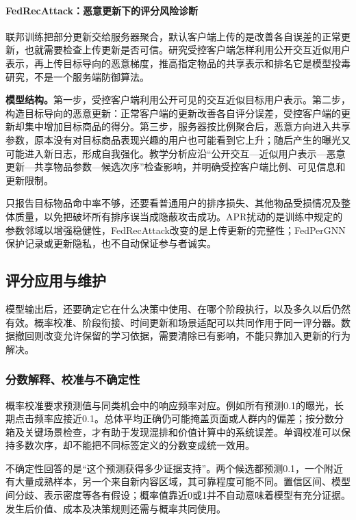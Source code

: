 \paragraph{FedRecAttack：恶意更新下的评分风险诊断}
\label{sec:rs-fedrecattack}

联邦训练把部分更新交给服务器聚合，默认客户端上传的是改善各自误差的正常更新，也就需要检查上传更新是否可信。研究受控客户端怎样利用公开交互近似用户表示，再上传目标导向的恶意梯度，推高指定物品的共享表示和排名它是模型投毒研究，不是一个服务端防御算法。

\textbf{模型结构。}第一步，受控客户端利用公开可见的交互近似目标用户表示。第二步，构造目标导向的恶意更新：正常客户端的更新改善各自评分误差，受控客户端的更新却集中增加目标商品的得分。第三步，服务器按比例聚合后，恶意方向进入共享参数，原本没有对目标商品表现兴趣的用户也可能看到它上升；随后产生的曝光又可能进入新日志，形成自我强化。教学分析应沿“公开交互—近似用户表示—恶意更新—共享物品参数—候选次序”检查影响，并明确受控客户端比例、可见信息和更新限制。

只报告目标物品命中率不够，还要看普通用户的排序损失、其他物品受损情况及整体质量，以免把破坏所有排序误当成隐蔽攻击成功。APR扰动的是训练中规定的参数邻域以增强稳健性，FedRecAttack改变的是上传更新的完整性；FedPerGNN保护记录或更新隐私，也不自动保证参与者诚实。

\subsection{评分应用与维护}
\label{sec:rs-scoring-maintenance}

模型输出后，还要确定它在什么决策中使用、在哪个阶段执行，以及多久以后仍然有效。概率校准、阶段衔接、时间更新和场景适配可以共同作用于同一评分器。数据撤回则改变允许保留的学习依据，需要清除已有影响，不能只靠加入更新的行为解决。

\subsubsection{分数解释、校准与不确定性}
\label{sec:rs-score-calibration}

概率校准要求预测值与同类机会中的响应频率对应。例如所有预测0.1的曝光，长期点击频率应接近0.1。总体平均正确仍可能掩盖页面或人群内的偏差；按分数分箱及关键场景检查，才有助于发现混排和价值计算中的系统误差。单调校准可以保持多数次序，却不能把不同标签定义的分数变成统一效用。

不确定性回答的是“这个预测获得多少证据支持”。两个候选都预测0.1，一个附近有大量成熟样本，另一个来自新内容区域，其可靠程度可能不同。置信区间、模型间分歧、表示密度等各有假设；概率值靠近0或1并不自动意味着模型有充分证据。发生后价值、成本及决策规则还需与概率共同使用。

